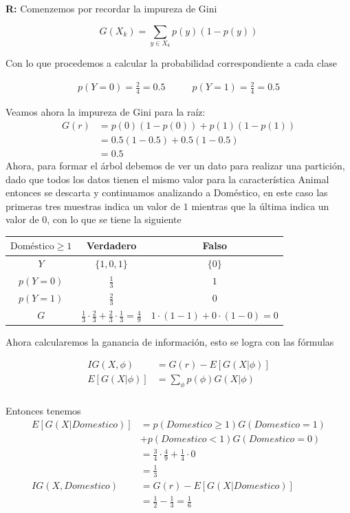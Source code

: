 \textbf{R:} Comenzemos por recordar la impureza de Gini 

\[G(X_k) = \sum_{y \in X_k} p(y)(1-p(y))\]

Con lo que procedemos a calcular la probabilidad correspondiente a cada clase

\begin{align*}
    p(Y=0) = \frac{2}{4}=0.5\quad &\quad p(Y=1) = \frac{2}{4}=0.5
\end{align*}

Veamos ahora la impureza de Gini para la raíz:
\begin{align*}
    G(r) &= p(0)(1-p(0))+p(1)(1-p(1))\\
    &= 0.5(1-0.5)+0.5(1-0.5)\\
    &= 0.5
\end{align*}
Ahora, para formar el árbol debemos de ver un dato para realizar una partición, dado que todos los datos tienen el mismo valor para la característica Animal entonces se descarta y continuamos analizando a Doméstico, en este caso las primeras tres muestras indica un valor de $1$ mientras que la última indica un valor de $0$, con lo que se tiene la siguiente
\begin{center}
    \begin{tabular}{c|c|c}
    $\text{Doméstico}\geq 1$ & Verdadero & Falso \\
    \hline
    $Y$ & $\{1,0,1\}$ & $\{0\}$ \\
    \hline
    $p(Y=0)$ & $\frac{1}{3}$ & $1$ \\[0.1cm]
    $p(Y=1)$ & $\frac{2}{3}$ & $0$ \\[0.1cm]
    \hline
    $G$ & $\frac{1}{3}\cdot\frac{2}{3}+\frac{2}{3}\cdot\frac{1}{3}=\frac{4}{9}$ & $1\cdot(1-1)+0\cdot(1-0)=0$
    \end{tabular}
\end{center}

Ahora calcularemos la ganancia de información, esto se logra con las fórmulas

\begin{align*}
    IG(X,\phi) &= G(r)-E[G(X|\phi)]\\
    E[G(X|\phi)] &= \sum_{\phi} p(\phi) G(X|\phi)\\
\end{align*}

Entonces tenemos
\begin{align*}
    E[G(X|Domestico)] &= p(Domestico\geq 1) G(Domestico=1) \\&+ p(Domestico<1) G(Domestico=0)\\
    &= \frac{3}{4}\cdot\frac{4}{9}+\frac{1}{4}\cdot 0\\
    &= \frac{1}{3}\\
    IG(X, Domestico) &= G(r)-E[G(X|Domestico)]\\
    &= \frac{1}{2} - \frac{1}{3} = \frac{1}{6}
\end{align*}

